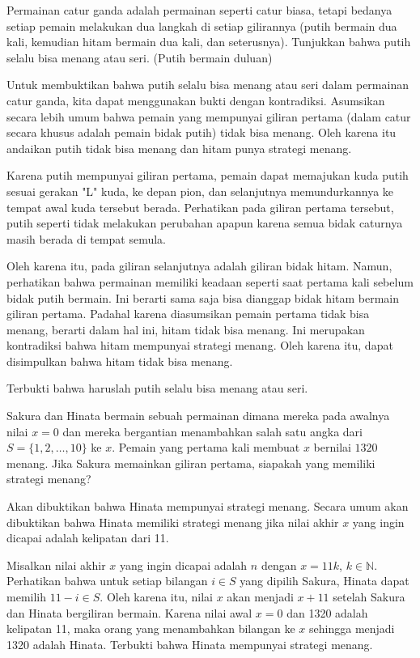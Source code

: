 \documentclass[12pt]{scrartcl}
\begin{document}
\begin{soaljawab}
Permainan catur ganda adalah permainan seperti catur biasa, tetapi bedanya setiap pemain melakukan dua langkah di setiap gilirannya (putih bermain dua kali, kemudian hitam bermain dua kali, dan seterusnya). Tunjukkan bahwa putih selalu bisa menang atau seri. (Putih bermain duluan)
    \begin{solusi}
        Untuk membuktikan bahwa putih selalu bisa menang atau seri dalam permainan catur ganda, kita dapat menggunakan bukti dengan kontradiksi. Asumsikan secara lebih umum bahwa pemain yang mempunyai giliran pertama (dalam catur secara khusus adalah pemain bidak putih) tidak bisa menang. Oleh karena itu andaikan putih tidak bisa menang dan hitam punya strategi menang.
        
        Karena putih mempunyai giliran pertama, pemain dapat memajukan kuda putih sesuai gerakan "L" kuda, ke depan pion, dan selanjutnya memundurkannya ke tempat awal kuda tersebut berada. Perhatikan pada giliran pertama tersebut, putih seperti tidak melakukan perubahan apapun karena semua bidak caturnya masih berada di tempat semula. 
        
        Oleh karena itu, pada giliran selanjutnya adalah giliran bidak hitam. Namun, perhatikan bahwa permainan memiliki keadaan seperti saat pertama kali sebelum bidak putih bermain. Ini berarti sama saja bisa dianggap bidak hitam bermain giliran pertama. Padahal karena diasumsikan pemain pertama tidak bisa menang, berarti dalam hal ini, hitam tidak bisa menang. Ini merupakan kontradiksi bahwa hitam mempunyai strategi menang. Oleh karena itu, dapat disimpulkan bahwa hitam tidak bisa menang.

        Terbukti bahwa haruslah putih selalu bisa menang atau seri.
    \end{solusi}
\end{soaljawab}

\begin{soaljawab}
Sakura dan Hinata bermain sebuah permainan dimana mereka pada awalnya nilai $x=0$ dan mereka bergantian menambahkan salah satu angka dari $S=\{1,2,\dots,10\}$ ke $x$. Pemain yang pertama kali membuat $x$ bernilai $1320$ menang. Jika Sakura memainkan giliran pertama, siapakah yang memiliki strategi menang?
    \begin{solusi}
        Akan dibuktikan bahwa Hinata mempunyai strategi menang. Secara umum akan dibuktikan bahwa Hinata memiliki strategi menang jika nilai akhir $x$ yang ingin dicapai adalah kelipatan dari 11. 

        Misalkan nilai akhir $x$ yang ingin dicapai adalah $n$ dengan $x=11k$, $k \in \mathbb{N}$. Perhatikan bahwa untuk setiap bilangan $i \in S$ yang dipilih Sakura, Hinata dapat memilih $11-i \in S$. Oleh karena itu, nilai $x$ akan menjadi $x+11$ setelah Sakura dan Hinata bergiliran bermain. Karena nilai awal $x=0$ dan 1320 adalah kelipatan 11, maka orang yang menambahkan bilangan ke $x$ sehingga menjadi 1320 adalah Hinata. Terbukti bahwa Hinata mempunyai strategi menang.
    \end{solusi}
\end{soaljawab}
\end{document}
